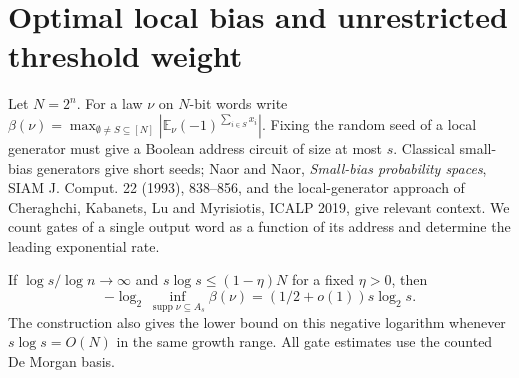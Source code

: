 \section{Optimal local bias and unrestricted threshold weight}
Let $N=2^n$. For a law $\nu$ on $N$-bit words write
$\beta(\nu)=\max_{\emptyset\ne S\subseteq[N]}|\mathbb E_\nu(-1)^{\sum_{i\in S}x_i}|$.
Fixing the random seed of a local generator must give a Boolean address circuit of size at most $s$. Classical small-bias generators give short seeds; Naor and Naor, \emph{Small-bias probability spaces}, SIAM J. Comput. 22 (1993), 838--856, and the local-generator approach of Cheraghchi, Kabanets, Lu and Myrisiotis, ICALP 2019, give relevant context. We count gates of a single output word as a function of its address and determine the leading exponential rate.
\begin{theorem}
If $\log s/\log n\to\infty$ and $s\log s\le(1-\eta)N$ for a fixed $\eta>0$, then
\[
  -\log_2\inf_{\operatorname{supp}\nu\subseteq A_s}\beta(\nu)
     =(1/2+o(1))s\log_2 s .
\]
The construction also gives the lower bound on this negative logarithm whenever $s\log s=O(N)$ in the same growth range. All gate estimates use the counted De Morgan basis.
\end{theorem}
